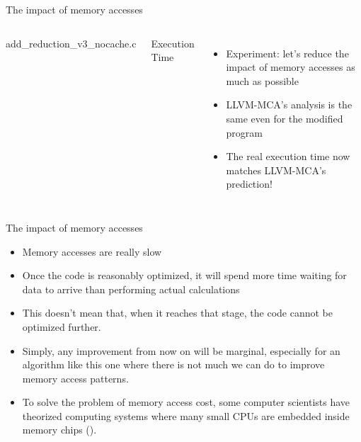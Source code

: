\begin{frame}{The impact of memory accesses}
\begin{columns}

\begin{block}{add\_reduction\_v3\_nocache.c}
\end{block}
\begin{block}{Execution Time}
\end{block}

\begin{itemize}
\item Experiment: let's reduce the impact of memory accesses as much as possible
\item LLVM-MCA's analysis is the same even for the modified program
\item The real execution time now matches LLVM-MCA's prediction!
\end{itemize}

\end{columns}
\end{frame}


\begin{frame}{The impact of memory accesses}
\large
\begin{itemize}
\item Memory accesses are \alert{really slow}
\item Once the code is reasonably optimized, it will spend \alert{more time waiting for data to arrive} than performing actual calculations
\bigskip
\normalsize
\item This doesn't mean that, when it reaches that stage, the code cannot be optimized further.
\item Simply, any improvement from now on will be \alert{marginal}, especially for an algorithm like this one where there is not much we can do to improve memory access patterns.
\bigskip
\footnotesize
\item To solve the problem of memory access cost, some computer scientists have theorized computing systems where many small CPUs are embedded inside memory chips (\cite{MUTLU201928}).
\end{itemize}
\end{frame}


